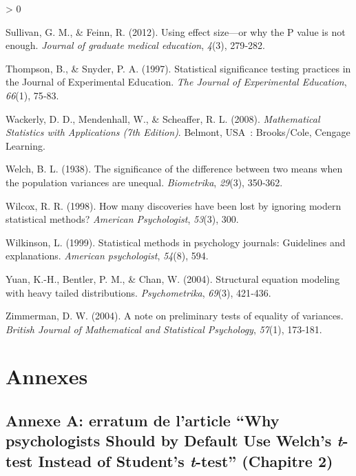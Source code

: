 \documentclass[
  12pt,
  french,
]{article}
\newlength{\cslhangindent}
\newenvironment{CSLReferences}[2] %
 {%
  \setlength{\parindent}{0pt}
  \ifodd #1 \everypar{\setlength{\hangindent}{\cslhangindent}}\ignorespaces\fi
  \ifnum #2 > 0
  \setlength{\parskip}{#2\baselineskip}
  \fi
 }%
 {}
\begin{document}
\begin{CSLReferences}{1}{0}
\leavevmode\hypertarget{ref-sullivan_using_2012}{}%
Sullivan, G. M., \& Feinn, R. (2012). Using effect size---or why the P
value is not enough. \emph{Journal of graduate medical education},
\emph{4}(3), 279‑282.

\leavevmode\hypertarget{ref-thompson_statistical_1997}{}%
Thompson, B., \& Snyder, P. A. (1997). Statistical significance testing
practices in the Journal of Experimental Education. \emph{The Journal of
Experimental Education}, \emph{66}(1), 75‑83.

\leavevmode\hypertarget{ref-wackerly_mathematical_2008}{}%
Wackerly, D. D., Mendenhall, W., \& Scheaffer, R. L. (2008).
\emph{Mathematical Statistics with Applications (7th Edition)}. Belmont,
{USA}~: Brooks/Cole, Cengage Learning.

\leavevmode\hypertarget{ref-welch_significance_1938}{}%
Welch, B. L. (1938). The significance of the difference between two
means when the population variances are unequal. \emph{Biometrika},
\emph{29}(3), 350‑362.

\leavevmode\hypertarget{ref-wilcox_how_1998}{}%
Wilcox, R. R. (1998). How many discoveries have been lost by ignoring
modern statistical methods? \emph{American Psychologist}, \emph{53}(3),
300.

\leavevmode\hypertarget{ref-wilkinson_statistical_1999}{}%
Wilkinson, L. (1999). Statistical methods in psychology journals:
Guidelines and explanations. \emph{American psychologist}, \emph{54}(8),
594.

\leavevmode\hypertarget{ref-yuan_structural_2004}{}%
Yuan, K.-H., Bentler, P. M., \& Chan, W. (2004). Structural equation
modeling with heavy tailed distributions. \emph{Psychometrika},
\emph{69}(3), 421‑436.

\leavevmode\hypertarget{ref-zimmerman_note_2004}{}%
Zimmerman, D. W. (2004). A note on preliminary tests of equality of
variances. \emph{British Journal of Mathematical and Statistical
Psychology}, \emph{57}(1), 173‑181.

\end{CSLReferences}

\endgroup

\newpage

\hypertarget{annexes}{%
\section{Annexes}\label{annexes}}

\hypertarget{annexe-a-erratum-de-larticle-why-psychologists-should-by-default-use-welchs-t-test-instead-of-students-t-test-chapitre-2}{%
\subsection{\texorpdfstring{Annexe A: erratum de l'article ``Why
psychologists Should by Default Use Welch's \emph{t}-test Instead of
Student's \emph{t}-test'' (Chapitre
2)}{Annexe A: erratum de l'article ``Why psychologists Should by Default Use Welch's t-test Instead of Student's t-test'' (Chapitre 2)}}\label{annexe-a-erratum-de-larticle-why-psychologists-should-by-default-use-welchs-t-test-instead-of-students-t-test-chapitre-2}}
\end{document}

